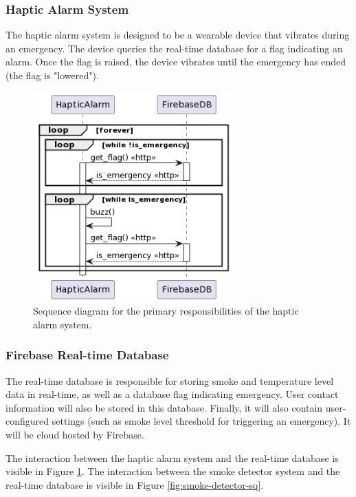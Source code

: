 \subsubsection{Haptic Alarm System}

The haptic alarm system is designed to be a wearable device that vibrates during an emergency. The device queries the
real-time database for a flag indicating an alarm. Once the flag is raised, the device vibrates until the emergency has
ended (the flag is "lowered").

\begin{figure}[H]
    \centering
    \includegraphics[width=3in]{../assets/HapticAlarmSequence.png}
    \caption{Sequence diagram for the primary responsibilities of the haptic alarm system.}
    \label{fig:haptic-alarm-sq}
\end{figure}

\subsubsection{Firebase Real-time Database}

The real-time database is responsible for storing smoke and temperature level data in real-time, as well as a database
flag indicating emergency. User contact information will also be stored in this database. Finally, it will also contain
user-configured settings (such as smoke level threshold for triggering an emergency). It will be cloud hosted by
Firebase.

The interaction between the haptic alarm system and the real-time database is visible in Figure
\ref{fig:haptic-alarm-sq}. The interaction between the smoke detector system and the real-time database is visible in
Figure \ref{fig:smoke-detector-sq}.

